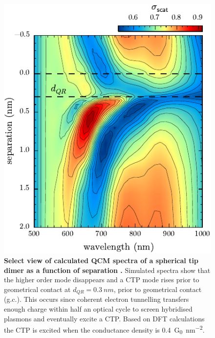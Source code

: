 \documentclass[a4paper]{article}
\begin{document}
\begin{figure}[bt]
\centering
\includegraphics{figures/qcm_tip_theory_zoom}
\caption[Select view of calculated QCM spectra of a spherical tip dimer as a function of separation \cite{savage2012}]{\textbf{Select view of calculated QCM spectra of a spherical tip dimer as a function of separation \cite{savage2012}.} Simulated spectra show that the higher order mode disappears and a CTP mode rises prior to geometrical contact at $d_{QR}=\SI{0.3}{nm}$, prior to geometrical contact (g.c.). This occurs since coherent electron tunnelling transfers enough charge within half an optical cycle to screen hybridised plasmons and eventually excite a CTP. Based on DFT calculations the CTP is excited when the conductance density is \SI{0.4}{G_0.nm^{-2}}.}
\label{fig:qcm_tip_theory}
\end{figure}
\end{document}

